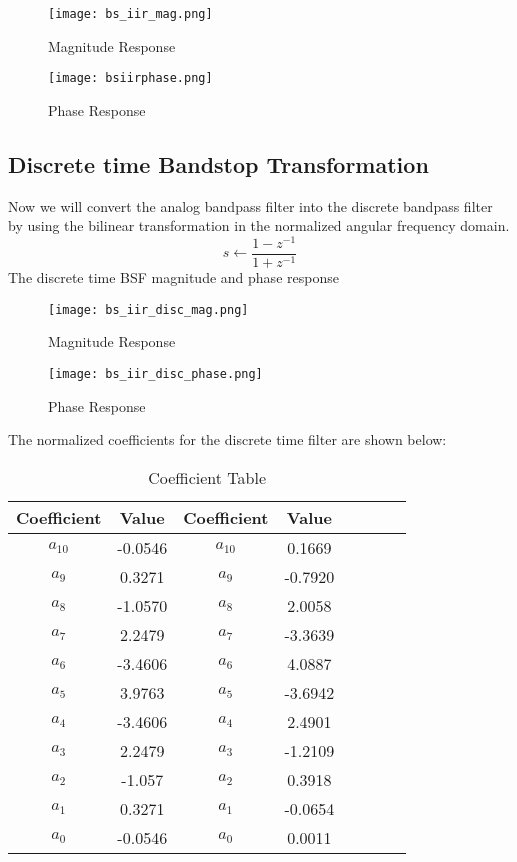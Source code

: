 \documentclass[12pt]{article}
\begin{document}
\begin{figure}[H]
\centering
\texttt{[image: bs\_iir\_mag.png]}
\caption{Magnitude Response}
\label{fig:mesh2}
\end{figure}

\begin{figure}[H]
\centering
\texttt{[image: bsiirphase.png]}
\caption{Phase Response}
\label{fig:mesh2}
\end{figure}




\subsection{\textbf{Discrete time Bandstop Transformation}}
Now we will convert the analog bandpass filter into the discrete bandpass filter by using the bilinear transformation in the normalized angular frequency domain.
\begin{equation*}
    s \longleftarrow \frac{1-z^{-1}}{1+z^{-1}}
\end{equation*}
The discrete time BSF magnitude and phase response
\begin{figure}[H]
\centering
\texttt{[image: bs\_iir\_disc\_mag.png]}
\caption{Magnitude Response}
\label{fig:mesh2}
\end{figure}
\begin{figure}[H]
\centering
\texttt{[image: bs\_iir\_disc\_phase.png]}
\caption{Phase Response}
\label{fig:mesh2}
\end{figure}
The normalized coefficients for the discrete time filter are shown below:
\begin{table}[h!]
		\begin{center}
		\caption{Coefficient Table}
		\begin{tabular}{|c|c|c|c|c|c|c|c|}
			\hline
			  Coefficient & Value& Coefficient & Value \\
			\hline
			$a_{10}$&-0.0546 & $a_{10}$&0.1669\\
			\hline
		    $a_{9}$&0.3271& $a_{9}$&-0.7920\\
			\hline
			$a_{8}$&-1.0570& $a_{8}$&2.0058\\
			\hline
			$a_{7}$&2.2479& $a_{7}$&-3.3639\\
			\hline
			$a_{6}$&-3.4606& $a_{6}$&4.0887\\
			\hline
			$a_{5}$&3.9763& $a_{5}$&-3.6942\\
			\hline
			$a_{4}$&-3.4606& $a_{4}$&2.4901\\
			\hline
			$a_{3}$&2.2479& $a_{3}$&-1.2109\\
			\hline
			$a_{2}$&-1.057& $a_{2}$&0.3918\\
			\hline
			$a_{1}$&0.3271& $a_{1}$&-0.0654\\
			\hline
			 $a_{0}$&-0.0546& $a_{0}$&0.0011\\
			 \hline
		\end{tabular}
		\end{center}
\end{table}
\end{document}
